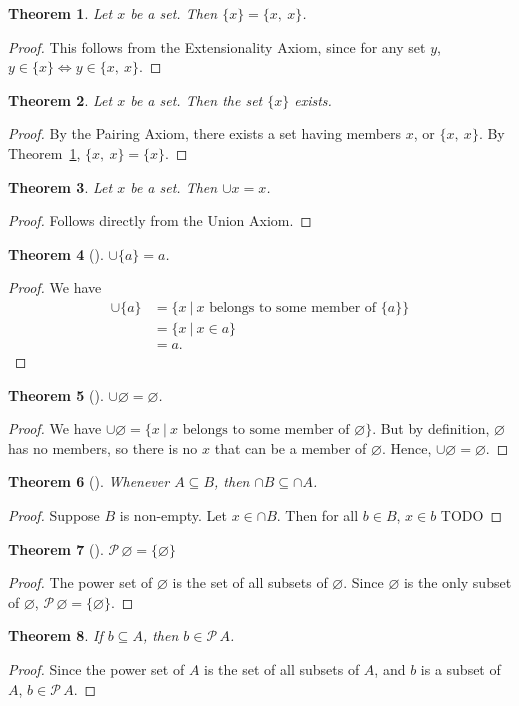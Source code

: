 \documentclass[12pt]{article}
\theoremstyle{plain}
\newtheorem{thm}{Theorem}[section]
\theoremstyle{remark}
\theoremstyle{definition}
\theoremstyle{remark}
\newcommand{\powerset}{\mathscr{P}\,}
\newcommand{\thmproof}[3]{%
  \begin{thm}[#1]
    #2
  \end{thm}
  \begin{proof}
    #3
  \end{proof}
}
\begin{document}
\begin{thm}\label{multi}
  Let $x$ be a set. Then $\{x\} = \{x,\ x\}$.
\end{thm}
\begin{proof}
  This follows from the Extensionality Axiom, since for any set $y$, $y \in \{x\} \Leftrightarrow y \in \{x,\ x\}$.
\end{proof}

\begin{thm}
  Let $x$ be a set. Then the set $\{x\}$ exists.
\end{thm}
\begin{proof}
  By the Pairing Axiom, there exists a set having members $x$, or $\{x,\ x\}$. By Theorem~\ref{multi}, $\{x,\ x\} = \{x\}$.
\end{proof}

\begin{thm}
  Let $x$ be a set. Then $\cup x = x$.
\end{thm}
\begin{proof}
  Follows directly from the Union Axiom.
\end{proof}

\thmproof{}{$\cup{\{a\}} = a$.}
{We have
  \begin{align*}
    \cup{\{a\}} &= \{x\ |\ \text{$x$ belongs to some member of $\{a\}$}\}\\
                &= \{x\ |\ x \in a\}\\
                &= a.
  \end{align*}
}

\thmproof{}{$\cup \varnothing = \varnothing$.}
{We have $\cup \varnothing = \{x\ |\ \text{$x$ belongs to some member of $\varnothing$}\}$. But by definition, $\varnothing$ has no members, so there is no $x$ that can be a member of $\varnothing$. Hence, $\cup \varnothing = \varnothing$.
}

\thmproof{}{Whenever $A \subseteq B$, then $\cap B \subseteq \cap A$.}
{Suppose $B$ is non-empty. Let $x \in \cap B$. Then for all $b \in B$, $x \in b$ TODO
}

\thmproof{}{$\powerset \varnothing = \{\varnothing\}$}
{The power set of $\varnothing$ is the set of all subsets of $\varnothing$. Since $\varnothing$ is the only subset of $\varnothing$, $\powerset \varnothing = \{\varnothing \}$.
}

\begin{thm}\label{powersetMember}
  If $b \subseteq A$, then $b \in \powerset A$.
\end{thm}
\begin{proof}
  Since the power set of $A$ is the set of all subsets of $A$, and $b$ is a subset of $A$, $b \in \powerset A$.
\end{proof}
\end{document}
